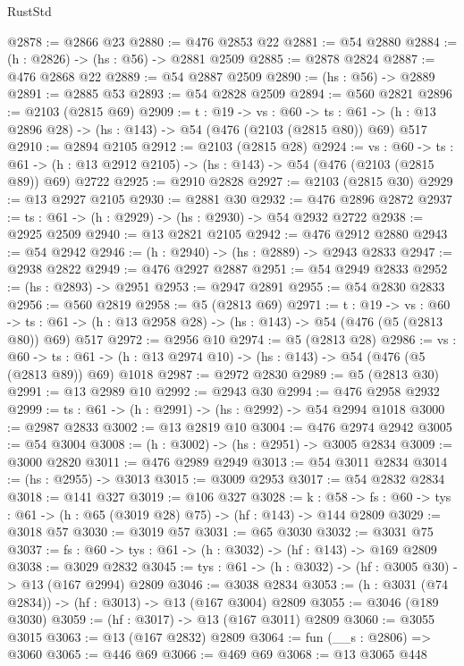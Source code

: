 \begin{lexlean}{RustStd}
\begin{coremodule}
@2878 := @2866 @23
@2880 := @476 @2853 @22
@2881 := @54 @2880
@2884 := (h : @2826) -> (hs : @56) -> @2881 @2509
@2885 := @2878 @2824
@2887 := @476 @2868 @22
@2889 := @54 @2887 @2509
@2890 := (hs : @56) -> @2889
@2891 := @2885 @53
@2893 := @54 @2828 @2509
@2894 := @560 @2821
@2896 := @2103 (@2815 @69)
@2909 := {t : @19} ->
  {vs : @60} ->
  {ts : @61} -> (h : @13 @2896 @28) -> (hs : @143) -> @54 (@476 (@2103 (@2815 @80)) @69) @517
@2910 := @2894 @2105
@2912 := @2103 (@2815 @28)
@2924 := {vs : @60} ->
  {ts : @61} -> (h : @13 @2912 @2105) -> (hs : @143) -> @54 (@476 (@2103 (@2815 @89)) @69) @2722
@2925 := @2910 @2828
@2927 := @2103 (@2815 @30)
@2929 := @13 @2927 @2105
@2930 := @2881 @30
@2932 := @476 @2896 @2872
@2937 := {ts : @61} -> (h : @2929) -> (hs : @2930) -> @54 @2932 @2722
@2938 := @2925 @2509
@2940 := @13 @2821 @2105
@2942 := @476 @2912 @2880
@2943 := @54 @2942
@2946 := (h : @2940) -> (hs : @2889) -> @2943 @2833
@2947 := @2938 @2822
@2949 := @476 @2927 @2887
@2951 := @54 @2949 @2833
@2952 := (hs : @2893) -> @2951
@2953 := @2947 @2891
@2955 := @54 @2830 @2833
@2956 := @560 @2819
@2958 := @5 (@2813 @69)
@2971 := {t : @19} ->
  {vs : @60} ->
  {ts : @61} -> (h : @13 @2958 @28) -> (hs : @143) -> @54 (@476 (@5 (@2813 @80)) @69) @517
@2972 := @2956 @10
@2974 := @5 (@2813 @28)
@2986 := {vs : @60} ->
  {ts : @61} -> (h : @13 @2974 @10) -> (hs : @143) -> @54 (@476 (@5 (@2813 @89)) @69) @1018
@2987 := @2972 @2830
@2989 := @5 (@2813 @30)
@2991 := @13 @2989 @10
@2992 := @2943 @30
@2994 := @476 @2958 @2932
@2999 := {ts : @61} -> (h : @2991) -> (hs : @2992) -> @54 @2994 @1018
@3000 := @2987 @2833
@3002 := @13 @2819 @10
@3004 := @476 @2974 @2942
@3005 := @54 @3004
@3008 := (h : @3002) -> (hs : @2951) -> @3005 @2834
@3009 := @3000 @2820
@3011 := @476 @2989 @2949
@3013 := @54 @3011 @2834
@3014 := (hs : @2955) -> @3013
@3015 := @3009 @2953
@3017 := @54 @2832 @2834
@3018 := @141 @327
@3019 := @106 @327
@3028 := {k : @58} ->
  {fs : @60} -> {tys : @61} -> (h : @65 (@3019 @28) @75) -> (hf : @143) -> @144 @2809
@3029 := @3018 @57
@3030 := @3019 @57
@3031 := @65 @3030
@3032 := @3031 @75
@3037 := {fs : @60} -> {tys : @61} -> (h : @3032) -> (hf : @143) -> @169 @2809
@3038 := @3029 @2832
@3045 := {tys : @61} -> (h : @3032) -> (hf : @3005 @30) -> @13 (@167 @2994) @2809
@3046 := @3038 @2834
@3053 := (h : @3031 (@74 @2834)) -> (hf : @3013) -> @13 (@167 @3004) @2809
@3055 := @3046 (@189 @3030)
@3059 := (hf : @3017) -> @13 (@167 @3011) @2809
@3060 := @3055 @3015
@3063 := @13 (@167 @2832) @2809
@3064 := fun (__s : @2806) => @3060
@3065 := @446 @69
@3066 := @469 @69
@3068 := @13 @3065 @448

\end{coremodule}
\end{lexlean}
